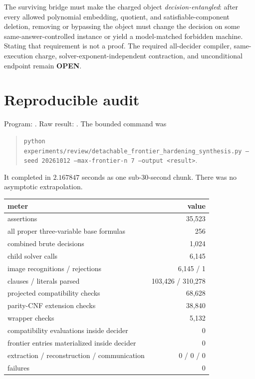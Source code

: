 \documentclass[11pt]{article}
\newcommand{\OPEN}{\textbf{OPEN}}
\begin{document}
The surviving bridge must make the charged object \emph{decision-entangled}:
after every allowed polynomial embedding, quotient, and satisfiable-component
deletion, removing or bypassing the object must change the decision on some
same-answer-controlled instance or yield a model-matched forbidden machine.
Stating that requirement is not a proof.  The required all-decider compiler,
same-execution charge, solver-exponent-independent contraction, and
unconditional endpoint remain \OPEN.

\section{Reproducible audit}

Program:
.
Raw result:
.
The bounded command was
\begin{quote}\small
\texttt{python experiments/review/detachable\_frontier\_hardening\_synthesis.py
--seed 20261012 --max-frontier-n 7 --output <result>}.
\end{quote}
It completed in \(2.167847\) seconds as one sub-30-second chunk.  There was no
asymptotic extrapolation.

\begin{center}\small
\begin{tabular}{lr}
\toprule
meter & value\\ \midrule
assertions & 35,523\\
all proper three-variable base formulas & 256\\
combined brute decisions & 1,024\\
child solver calls & 6,145\\
image recognitions / rejections & 6,145 / 1\\
clauses / literals parsed & 103,426 / 310,278\\
projected compatibility checks & 68,628\\
parity-CNF extension checks & 38,840\\
wrapper checks & 5,132\\
compatibility evaluations inside decider & 0\\
frontier entries materialized inside decider & 0\\
extraction / reconstruction / communication & 0 / 0 / 0\\
failures & 0\\
\bottomrule
\end{tabular}
\end{center}
\end{document}

